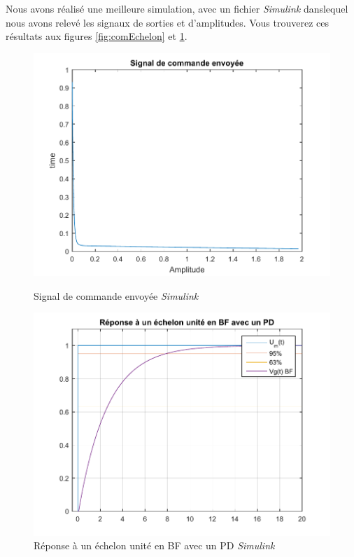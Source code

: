 Nous avons réalisé une meilleure simulation, avec un fichier \emph{Simulink} danslequel nous avons relevé les signaux de sorties et d'amplitudes. Vous trouverez ces résultats aux figures \ref{fig:comEchelon} et \ref{fig:repEchelon}.
\begin{figure}[!ht]
\begin{minipage}{.5\textwidth}
\centering
\includegraphics[width = \textwidth]{./II/images/commandePD.pdf}
\caption{Signal de commande envoyée \emph{Simulink}}\label{fig:comEchelon}
\end{minipage}
\begin{minipage}{.5\textwidth}
\centering
\includegraphics[width = \textwidth]{./II/images/rep_echelon_BF.pdf}
\caption{Réponse à un échelon unité en BF avec un PD \emph{Simulink}}\label{fig:repEchelon}
\end{minipage}
\end{figure}

